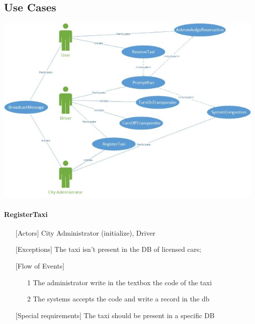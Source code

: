 \documentclass[12pt,a4paper]{book}
\begin{document}
			\subsection{Use Cases}
			\hfill\break	
			\includegraphics {USECase}
			\hfill\break
			\paragraph{RegisterTaxi}
			\begin{itemize}
				\item[\textbullet] [Actors] City Administrator (initialize), Driver
				\item[\textbullet] [Exceptions] The taxi isn't present in the DB of licensed cars;
				\item[\textbullet] [Flow of Events]
				\begin{itemize}
					\item[1] The administrator write in the textbox the code of the taxi
					\item[2] The systems accepts the code and write a record in the db
				\end{itemize}
				\item[\textbullet] [Special requirements] The taxi should be present in a specific DB
			\end{itemize}
\end{document}
